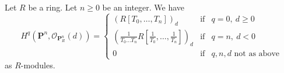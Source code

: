 %
\begin{lemma}
\label{lemma-cohomology-projective-space-over-ring}
\begin{reference}
\cite[III Proposition 2.1.12]{EGA}
\end{reference}
Let $R$ be a ring.
Let $n \geq 0$ be an integer.
We have
$$
H^q(\mathbf{P}^n, \mathcal{O}_{\mathbf{P}^n_R}(d)) =
\left\{
\begin{matrix}
(R[T_0, \ldots, T_n])_d & \text{if} & q = 0,\ d \geq 0 \\
\left(\frac{1}{T_0 \ldots T_n} R[\frac{1}{T_0}, \ldots, \frac{1}{T_n}]\right)_d
& \text{if} & q = n,\ d < 0 \\
0 & \text{if} & q, n, d\text{ not as above}
\end{matrix}
\right.
$$
as $R$-modules.
\end{lemma}

